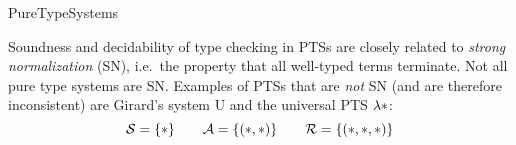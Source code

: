 \begin{entry}{PureTypeSystems}
\begin{technicalities}
Soundness and decidability of type checking in PTSs are closely related to \emph{strong normalization} (SN), i.e.~the property that all well-typed terms terminate. Not all pure type systems are SN. Examples of PTSs that are \emph{not} SN (and are therefore inconsistent) are Girard's system U and the universal PTS $\lambda{\ast}$:
\negvspace\[
  \sorts = \{\Prop\} \qquad \axioms = \{(\Prop, \Prop)\} \qquad \rules = \{(\Prop, \Prop, \Prop)\}
\negvspace\]
\end{technicalities}



%
%
%
%
%
%
%
%












\end{entry}
